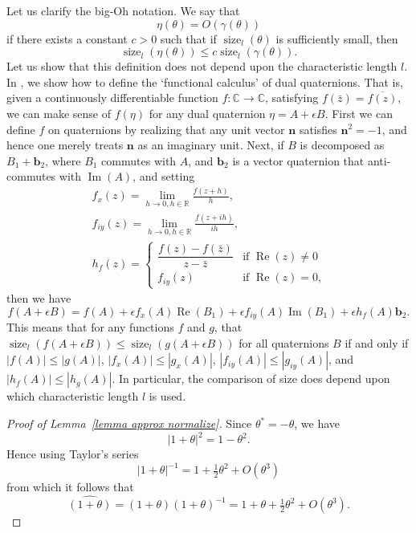 \documentclass[reqno,12pt]{amsart}
\DeclareMathOperator\realpart{Re}
\DeclareMathOperator\imagpart{Im}
\DeclareMathOperator\size{{size}}
\begin{document}
Let us clarify the big-Oh notation.  We say that
\begin{equation}
\eta(\theta) = O(\gamma(\theta))
\end{equation}
if there exists a constant $c>0$ such that if $\size_l(\theta)$ is sufficiently small, then
\begin{equation}
\size_l( \eta(\theta)) \le c \size_l ( \gamma(\theta)) .
\end{equation}
Let us show that this definition does not depend upon the characteristic length $l$.  In \cite{montgomery-smith-functional-calculus}, we show how to define the `functional calculus' of dual quaternions.  That is, given a continuously differentiable function $f:\mathbb C \to \mathbb C$, satisfying $f(\bar z) = \overline{f(z)}$, we can make sense of $f(\eta)$ for any dual quaternion $\eta = A + \epsilon B$.  First we can define $f$ on quaternions by realizing that any unit vector $\bm n$ satisfies $\bm n^2 = -1$, and hence one merely treats $\bm n$ as an imaginary unit.  Next, if $B$ is decomposed as $B_1 + \bm b_2$, where $B_1$ commutes with $A$, and $\bm b_2$ is a vector quaternion that anti-commutes with $\imagpart(A)$, and setting
\begin{gather}
f_x(z) = \lim_{h \to 0, h \in \mathbb R} \frac{f(z+h)} h , \\
f_{iy}(z) = \lim_{h \to 0, h \in \mathbb R} \frac{f(z+ih)} {ih} , \\
h_f(z) = \begin{cases}\dfrac{f(z) - f(\bar z)}{z - \bar z} & \text{if $\realpart(z) \ne 0$} \\
f_{iy}(z) & \text{if $\realpart(z) = 0$,} \end{cases}
\end{gather}
then we have
\begin{equation}
f(A + \epsilon B) = f(A) + \epsilon f_x(A) \realpart(B_1) + \epsilon f_{iy}(A) \imagpart(B_1) + \epsilon h_f(A) \bm b_2.
\end{equation}
This means that for any functions $f$ and $g$, that $\size_l(f(A + \epsilon B)) \le \size_l(g(A + \epsilon B))$ for all quaternions $B$ if and only if $|f(A)| \le |g(A)|$, $|f_x(A)| \le |g_x(A)|$, $|f_{iy}(A)| \le |g_{iy}(A)|$, and $|h_f(A)| \le |h_g(A)|$.  In particular, the comparison of size does depend upon which characteristic length $l$ is used.

\begin{proof}[Proof of Lemma~\ref{lemma approx normalize}]  Since $\theta^* = -\theta$, we have
\begin{equation}
|1+\theta|^2 = 1 - \theta^2.
\end{equation}
Hence using Taylor's series
\begin{equation}
|1+\theta|^{-1} = 1 + \tfrac12 \theta^2 + O(\theta^3)
\end{equation}
from which it follows that
\begin{equation}
\widehat{(1+\theta)} = (1+\theta)(1+\theta)^{-1} = 1 + \theta + \tfrac12 \theta^2 + O(\theta^3)  .
\end{equation}
\end{proof}
\end{document}
